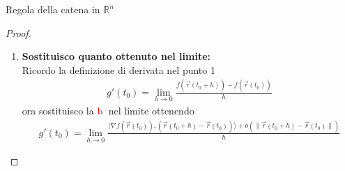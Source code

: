 \documentclass{article}  %
\begin{document}
\begin{theorem}{Regola della catena in $\mathbb{R}^n$}
\begin{proof}
\begin{enumerate}
{				      \begin{align*}
					      f(\vec{x}_0+\vec{h}) = f(\vec{x}_0) + \langle \nabla f(\vec{x}_0), \vec{h} \rangle + o \left(\|h\|\right) \quad \text{ per } \vec{h} \to \vec{0}
				      \end{align*}
				      ma per comodità di questa dimostrazione, abbiamo semplicemente impostato $\vec{h}=\vec{x}-\vec{x}_0$
			      } è:
			      \begin{align*}
				      f(\vec{x}) - f(\vec{x}_0) = \langle \nabla f(\vec{x}_0), \vec{x}-\vec{x}_0 \rangle + o\left( \| \vec{x}-\vec{x}_0 \| \right)  \quad \textcolor{red}{\textcircled{a}}
			      \end{align*}
			      dato che:
			      \begin{align*}
				      \begin{cases}
					      \vec{x}_0 = \vec{r}(t_0) \\
					      \vec{x} = \vec{r}(t_0 +h)
				      \end{cases}
			      \end{align*}
			      quindi sostituisco nella \textcolor{red}{\textcircled{a}} e ottengo:
			      \begin{align*}
				      f(\vec{r}(t_0 +h)) - f(\vec{r}(t_0)) = \langle \nabla f(\vec{r}(t_0)), (\vec{r}(t_0 +h)-\vec{r}(t_0)) \rangle + o\left( \| \vec{r}(t_0 +h)-\vec{r}(t_0) \| \right) \quad \textcolor{red}{\textcircled{b}}
			      \end{align*}
			      e notare che:
			      \begin{align*}
				      \underbrace{f(\vec{r}(t_0 +h))}_{=g(t_0+h)} - \underbrace{f(\vec{r}(t_0))}_{=g(t_0)} = \langle \nabla f(\vec{r}(t_0)), (\vec{r}(t_0 +h)-\vec{r}(t_0)) \rangle + o\left( \| \vec{r}(t_0 +h)-\vec{r}(t_0) \| \right)
			      \end{align*}
			\item \textbf{Sostituisco quanto ottenuto nel limite:} \\
			      Ricordo la definizione di derivata nel punto 1
			      \begin{align*}
				      g'(t_0) = \lim_{h \to 0} \frac{f(\vec{r}(t_0+h))-f(\vec{r}(t_0))}{h}
			      \end{align*}
			      ora sostituisco la \textcolor{red}{\textcircled{b}} nel limite ottenendo
			      \begin{align*}
				      g'(t_0) = \lim_{h \to 0} \frac{\langle \nabla f(\vec{r}(t_0)), (\vec{r}(t_0 +h)-\vec{r}(t_0)) \rangle + o\left( \| \vec{r}(t_0 +h)-\vec{r}(t_0) \| \right)}{h}

\end{align*}
\end{enumerate}
\end{proof}
\end{theorem}
\end{document}
